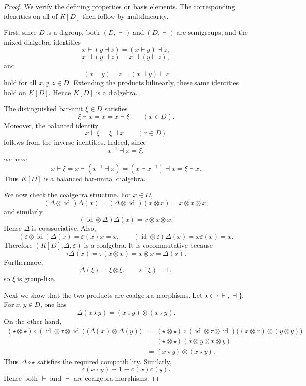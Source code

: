 \documentclass[10pt,a4paper]{amsart}
\newcommand{\id}{\operatorname{id}}
\begin{document}
	\begin{proof}
		We verify the defining properties on basis elements. The corresponding
		identities on all of \(K[D]\) then follow by multilinearity.
		
		First, since \(D\) is a digroup, both \((D,\vdash)\) and \((D,\dashv)\)
		are semigroups, and the mixed dialgebra identities
		\[
		x\vdash (y\dashv z)=(x\vdash y)\dashv z,
		\]
		\[
		x\dashv (y\dashv z)=x\dashv (y\vdash z),
		\]
		and
		\[
		(x\vdash y)\vdash z=(x\dashv y)\vdash z
		\]
		hold for all \(x,y,z\in D\). Extending the products bilinearly, these same
		identities hold on \(K[D]\). Hence \(K[D]\) is a dialgebra.
		
		The distinguished bar-unit \(\xi\in D\) satisfies
		\[
		\xi\vdash x=x=x\dashv \xi
		\qquad
		(x\in D).
		\]
		Moreover, the balanced identity
		\[
		x\vdash \xi=\xi\dashv x
		\qquad
		(x\in D)
		\]
		follows from the inverse identities. Indeed, since
		\[
		x^{-1}\dashv x=\xi,
		\]
		we have
		\[
		x\vdash \xi
		=
		x\vdash (x^{-1}\dashv x)
		=
		(x\vdash x^{-1})\dashv x
		=
		\xi\dashv x.
		\]
		Thus \(K[D]\) is a balanced bar-unital dialgebra.
		
		We now check the coalgebra structure. For \(x\in D\),
		\[
		(\Delta\otimes \id)\Delta(x)
		=
		(\Delta\otimes \id)(x\otimes x)
		=
		x\otimes x\otimes x,
		\]
		and similarly
		\[
		(\id\otimes \Delta)\Delta(x)
		=
		x\otimes x\otimes x.
		\]
		Hence \(\Delta\) is coassociative. Also,
		\[
		(\varepsilon\otimes \id)\Delta(x)=\varepsilon(x)x=x,
		\qquad
		(\id\otimes \varepsilon)\Delta(x)=x\varepsilon(x)=x.
		\]
		Therefore \((K[D],\Delta,\varepsilon)\) is a coalgebra. It is
		cocommutative because
		\[
		\tau\Delta(x)=\tau(x\otimes x)=x\otimes x=\Delta(x).
		\]
		Furthermore,
		\[
		\Delta(\xi)=\xi\otimes\xi,
		\qquad
		\varepsilon(\xi)=1,
		\]
		so \(\xi\) is group-like.
		
		Next we show that the two products are coalgebra morphisms. Let
		\(\star\in\{\vdash,\dashv\}\). For \(x,y\in D\), one has
		\[
		\Delta(x\star y)
		=
		(x\star y)\otimes(x\star y).
		\]
		On the other hand,
		\begin{align*}
			(\star\otimes \star)
			\circ(\id\otimes\tau\otimes\id)
			\bigl(\Delta(x)\otimes\Delta(y)\bigr)
			&=
			(\star\otimes \star)
			\circ(\id\otimes\tau\otimes\id)
			\bigl((x\otimes x)\otimes(y\otimes y)\bigr)\\
			&=
			(\star\otimes \star)(x\otimes y\otimes x\otimes y)\\
			&=
			(x\star y)\otimes(x\star y).
		\end{align*}
		Thus \(\Delta\circ\star\) satisfies the required compatibility. Similarly,
		\[
		\varepsilon(x\star y)=1=\varepsilon(x)\varepsilon(y).
		\]
		Hence both \(\vdash\) and \(\dashv\) are coalgebra morphisms.
		

\end{proof}
\end{document}
